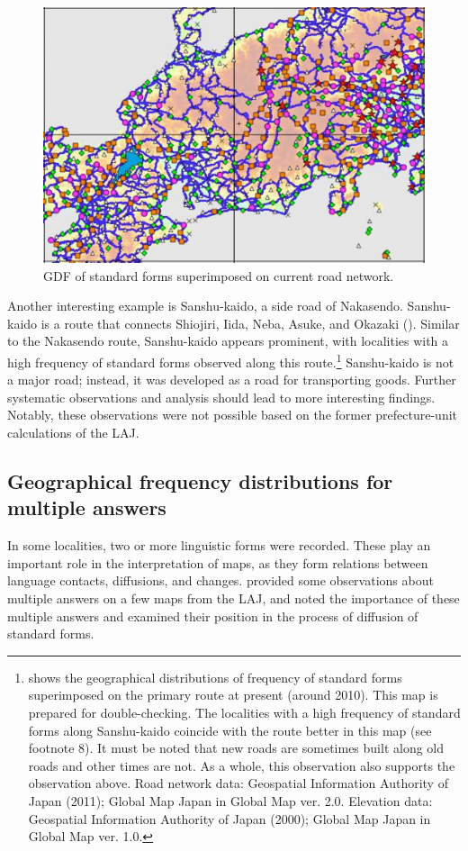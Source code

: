 \documentclass[output=paper]{LSP/langsci}
\begin{document}
\begin{figure}
\includegraphics[width=\textwidth]{illustrations/kuma_fig13}
\caption{GDF of standard forms superimposed on current road network.}          
\label{fig:13}
\end{figure}

\clearpage

Another interesting example is Sanshu-kaido, a side road of Nakasendo. Sanshu-kaido is a route that connects Shiojiri, Iida, Neba, Asuke, and Okazaki (). Similar to the Nakasendo route, Sanshu-kaido appears prominent, with localities with a high frequency of standard forms observed along this route.\footnote{ shows the geographical distributions of frequency of standard forms superimposed on the primary route at present (around 2010). This map is prepared for double-checking. The localities with a high frequency of standard forms along Sanshu-kaido coincide with the route better in this map (see footnote 8). It must be noted that new roads are sometimes built along old roads and other times are not. As a whole, this observation also supports the observation above. Road network data: Geospatial Information Authority of Japan (2011); Global Map Japan in Global Map ver. 2.0. Elevation data: Geospatial Information Authority of Japan (2000); Global Map Japan in Global Map ver. 1.0.} Sanshu-kaido is not a major road; instead, it was developed as a road for transporting goods. Further systematic observations and analysis should lead to more interesting findings. Notably, these observations were not possible based on the former prefecture-unit calculations of the LAJ.

 
\subsection{Geographical frequency distributions for multiple answers} 
In some localities, two or more linguistic forms were recorded. These  play an important role in the interpretation of maps, as they form relations between language contacts, diffusions, and changes. \citet{inagaki_hogen_1980} provided some observations about multiple answers on a few maps from the LAJ, and \citet{inoue_heiyo_2004} noted the importance of these multiple answers and examined their position in the process of diffusion of standard forms.
\end{document}
